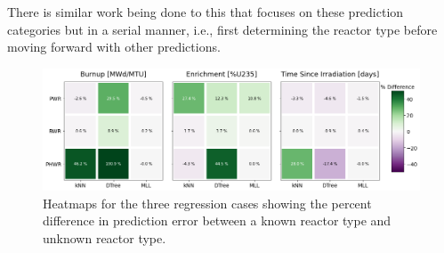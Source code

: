 There is similar work being done  to this that focuses
on these prediction categories but in a serial manner, i.e., first determining
the reactor type before moving forward with other predictions.

\begin{figure}[!htb]
  \centering
  \includegraphics[width=\textwidth]{./chapters/exp1/rxtr-type_known-unknown_diff.png}
  \caption{Heatmaps for the three regression cases showing the percent 
           difference in prediction error between a known reactor type 
           and unknown reactor type.}
  \label{fig:knownrxtr}
\end{figure}


